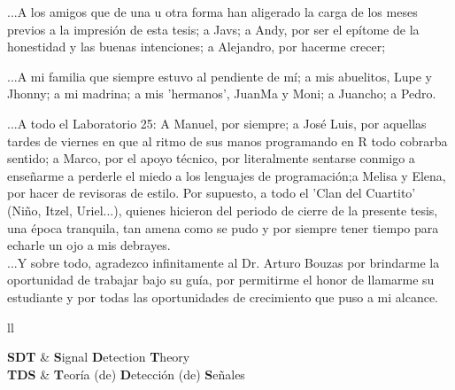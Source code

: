 \documentclass[
11pt, %
spanish, %
singlespacing, %
headsepline, %
]{MastersDoctoralThesis} %
\begin{document}
\begin{acknowledgements}
...A los amigos que de una u otra forma han aligerado la carga de los meses previos a la impresión de esta tesis; a Javs; a Andy, por ser el epítome de la honestidad y las buenas intenciones; a Alejandro, por hacerme crecer;

...A mi familia que siempre estuvo al pendiente de mí; a mis abuelitos, Lupe y Jhonny; a mi madrina; a mis 'hermanos', JuanMa y Moni; a Juancho; a Pedro.   

...A todo el Laboratorio 25: A Manuel, por siempre; a José Luis, por aquellas tardes de viernes en que al ritmo de sus manos programando en R todo cobrarba sentido; a Marco, por el apoyo técnico, por literalmente sentarse conmigo a enseñarme a perderle el miedo a los lenguajes de programación;a Melisa y Elena, por  hacer de revisoras de estilo. Por supuesto, a todo el 'Clan del Cuartito' (Niño, Itzel, Uriel...), quienes hicieron del periodo de cierre de la presente tesis, una época tranquila, tan amena como se pudo y por siempre tener tiempo para echarle un ojo a mis debrayes.\\

...Y sobre todo, agradezco infinitamente al Dr. Arturo Bouzas por brindarme la oportunidad de trabajar bajo su guía, por permitirme el honor de llamarme su estudiante y por todas las oportunidades de crecimiento que puso a mi alcance.

\end{acknowledgements}


\tableofcontents %

\listoffigures %

\listoftables %


\begin{abbreviations}{ll} %

\textbf{SDT} & \textbf{S}ignal \textbf{D}etection \textbf{T}heory\\
\textbf{TDS} & \textbf{T}eoría (de) \textbf{D}etección (de) \textbf{S}eñales\\

\end{abbreviations}
\end{document}
